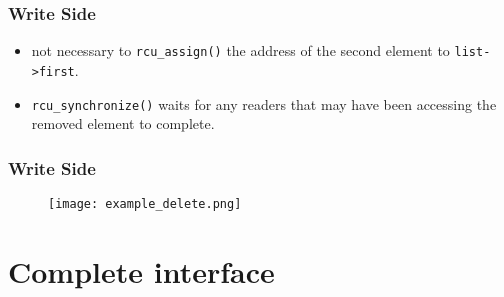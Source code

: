 \documentclass{beamer}
\begin{document}

\begin{frame}[t]
  \frametitle{Write Side}

  

  \begin{itemize}
  \item not necessary to \texttt{rcu\_assign()} the address of the second element to
    \texttt{list->first}.
  \item \texttt{rcu\_synchronize()} waits for any readers that may have been accessing the
    removed element to complete.
  \end{itemize}

\end{frame}


\begin{frame}[t]
  \frametitle{Write Side}
  \begin{figure}[ht]
    \centering
    \texttt{[image: example\_delete.png]}
  \end{figure}

\end{frame}


\section{Complete interface}

\end{document}
